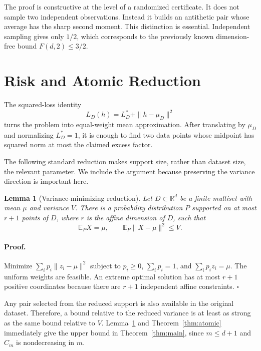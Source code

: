 \documentclass[twoside]{article}
\newtheorem{lemma}[theorem]{Lemma}
\newcommand{\R}{\mathbb R}
\newcommand{\E}{\mathbb E}
\begin{document}
The proof is constructive at the level of a randomized certificate. It does not sample two independent observations. Instead it builds an antithetic pair whose average has the sharp second moment. This distinction is essential. Independent sampling gives only $1/2$, which corresponds to the previously known dimension-free bound $F(d,2)\leq3/2$.

\section{Risk and Atomic Reduction}\label{sec:reduction}

The squared-loss identity
\begin{equation}\label{eq:biasvariance}
 L_D(h)=L_D^*+\|h-\mu_D\|^2
\end{equation}
turns the problem into equal-weight mean approximation. After translating by $\mu_D$ and normalizing $L_D^*=1$, it is enough to find two data points whose midpoint has squared norm at most the claimed excess factor.

The following standard reduction makes support size, rather than dataset size, the relevant parameter. We include the argument because preserving the variance direction is important here.

\begin{lemma}[Variance-minimizing reduction]\label{lem:reduction}
Let $D\subset\R^d$ be a finite multiset with mean $\mu$ and variance $V$. There is a probability distribution $P$ supported on at most $r+1$ points of $D$, where $r$ is the affine dimension of $D$, such that \[ \E_P X=\mu, \qquad \E_P\|X-\mu\|^2\leq V. \]
\end{lemma}

\paragraph{Proof.}
Minimize $\sum_i p_i\|z_i-\mu\|^2$ subject to $p_i\geq0$, $\sum_i p_i=1$, and $\sum_i p_i z_i=\mu$. The uniform weights are feasible. An extreme optimal solution has at most $r+1$ positive coordinates because there are $r+1$ independent affine constraints. \hfill$\square$

Any pair selected from the reduced support is also available in the original dataset. Therefore, a bound relative to the reduced variance is at least as strong as the same bound relative to $V$. Lemma~\ref{lem:reduction} and Theorem~\ref{thm:atomic} immediately give the upper bound in Theorem~\ref{thm:main}, since $m\leq d+1$ and $C_m$ is nondecreasing in $m$.
\end{document}
